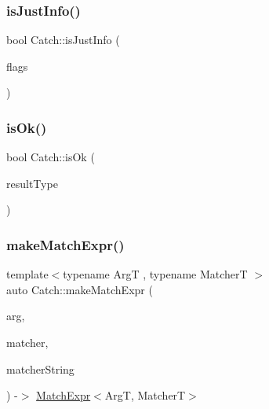 \mbox{\label{namespace_catch_a54b01af61673a3e1f21f31713639b180}} 
\subsubsection{\texorpdfstring{isJustInfo()}{isJustInfo()}}
{\footnotesize\ttfamily bool Catch\+::is\+Just\+Info (\begin{DoxyParamCaption}\item[{int}]{flags }\end{DoxyParamCaption})}

\mbox{\label{namespace_catch_a5205869c81c06d3460759cb86676ae68}} 
\subsubsection{\texorpdfstring{isOk()}{isOk()}}
{\footnotesize\ttfamily bool Catch\+::is\+Ok (\begin{DoxyParamCaption}\item[{\mbox{\hyperlink{struct_catch_1_1_result_was_a624e1ee3661fcf6094ceef1f654601ef}{Result\+Was\+::\+Of\+Type}}}]{result\+Type }\end{DoxyParamCaption})}

\mbox{\label{namespace_catch_a23a9a9a6dfef7ecd5e0eaf553fc52de6}} 
\subsubsection{\texorpdfstring{makeMatchExpr()}{makeMatchExpr()}}
{\footnotesize\ttfamily template$<$typename ArgT , typename MatcherT $>$ \\
auto Catch\+::make\+Match\+Expr (\begin{DoxyParamCaption}\item[{ArgT const \&}]{arg,  }\item[{MatcherT const \&}]{matcher,  }\item[{\mbox{\hyperlink{class_catch_1_1_string_ref}{String\+Ref}} const \&}]{matcher\+String }\end{DoxyParamCaption}) -\/$>$ \mbox{\hyperlink{class_catch_1_1_match_expr}{Match\+Expr}}$<$ArgT, MatcherT$>$ }

